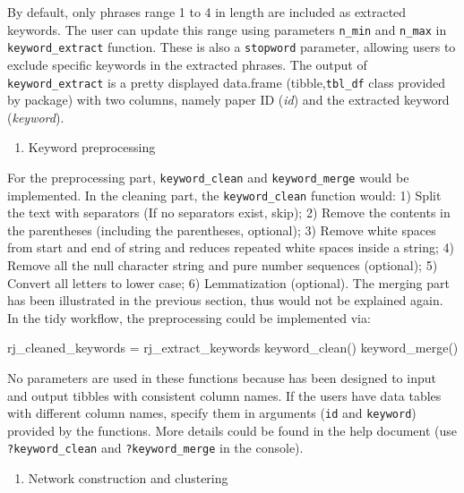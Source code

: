 By default, only phrases range 1 to 4 in length are included as
extracted keywords. The user can update this range using parameters
\texttt{n\_min} and \texttt{n\_max} in \texttt{keyword\_extract}
function. These is also a \texttt{stopword} parameter, allowing users to
exclude specific keywords in the extracted phrases. The output of
\texttt{keyword\_extract} is a pretty displayed data.frame
(tibble,\texttt{tbl\_df} class provided by  package)
with two columns, namely paper ID (\emph{id}) and the extracted keyword
(\emph{keyword}).

\begin{enumerate}
\def\labelenumi{(\arabic{enumi})}
\setcounter{enumi}{1}
\tightlist
\item
  Keyword preprocessing
\end{enumerate}

For the preprocessing part, \texttt{keyword\_clean} and
\texttt{keyword\_merge} would be implemented. In the cleaning part, the
\texttt{keyword\_clean} function would: 1) Split the text with
separators (If no separators exist, skip); 2) Remove the contents in the
parentheses (including the parentheses, optional); 3) Remove white
spaces from start and end of string and reduces repeated white spaces
inside a string; 4) Remove all the null character string and pure number
sequences (optional); 5) Convert all letters to lower case; 6)
Lemmatization (optional). The merging part has been illustrated in the
previous section, thus would not be explained again. In the tidy
workflow, the preprocessing could be implemented via:

\begin{Schunk}
\begin{Sinput}
rj_cleaned_keywords = rj_extract_keywords %
  keyword_clean() %
  keyword_merge()
\end{Sinput}
\end{Schunk}

No parameters are used in these functions because  has been
designed to input and output tibbles with consistent column names. If
the users have data tables with different column names, specify them in
arguments (\texttt{id} and \texttt{keyword}) provided by the functions.
More details could be found in the help document (use
\texttt{?keyword\_clean} and \texttt{?keyword\_merge} in the console).

\begin{enumerate}
\def\labelenumi{(\arabic{enumi})}
\setcounter{enumi}{2}
\tightlist
\item
  Network construction and clustering
\end{enumerate}

